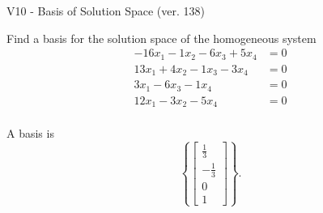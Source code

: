 \begin{exercise}
  \begin{exerciseTitle}V10 - Basis of Solution Space (ver. 138)\end{exerciseTitle}
  \begin{exerciseStatement}
    Find a basis for the solution space of the homogeneous system 
\begin{align*}
 -16 x_ 1 -1 x_ 2 -6 x_ 3 + 5 x_ 4 &= 0  \\ 
  13 x_ 1 + 4 x_ 2 -1 x_ 3 -3 x_ 4 &= 0  \\ 
  3 x_ 1 -6 x_ 3 -1 x_ 4 &= 0  \\ 
  12 x_ 1 -3 x_ 2 -5 x_ 4 &= 0  \\ 
 \end{align*}


 
  \end{exerciseStatement}

  \begin{exerciseAnswer}
   A basis is   
\[\left\{\left[\begin{array}{c}
\frac{1}{3} \\
-\frac{1}{3} \\
0 \\
1
\end{array}\right]\right\}.\]

  


  \end{exerciseAnswer}
\end{exercise}